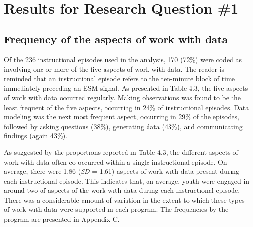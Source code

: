 \documentclass[]{book}
\theoremstyle{definition}
\theoremstyle{definition}
\theoremstyle{definition}
\theoremstyle{remark}
\begin{document}
\begin{table}

\caption{\label{tab:unnamed-chunk-8}Correlations among the continuous study variables}
\centering
{}
\end{table}

\section{Results for Research Question
\#1}\label{results-for-research-question-1}

\subsection{Frequency of the aspects of work with
data}\label{frequency-of-the-aspects-of-work-with-data}

Of the 236 instructional episodes used in the analysis, 170 (72\%) were
coded as involving one or more of the five aspects of work with data.
The reader is reminded that an instructional episode refers to the
ten-minute block of time immediately preceding an ESM signal. As
presented in Table 4.3, the five aspects of work with data occurred
regularly. Making observations was found to be the least frequent of the
five aspects, occurring in 24\% of instructional episodes. Data modeling
was the next most frequent aspect, occurring in 29\% of the episodes,
followed by asking questions (38\%), generating data (43\%), and
communicating findings (again 43\%).

As suggested by the proportions reported in Table 4.3, the different
aspects of work with data often co-occurred within a single
instructional episode. On average, there were 1.86 (\emph{SD} = 1.61)
aspects of work with data present during each instructional episode.
This indicates that, on average, youth were engaged in around two of
aspects of the work with data during each instructional episode. There
was a considerable amount of variation in the extent to which these
types of work with data were supported in each program. The frequencies
by the program are presented in Appendix C.
\end{document}
